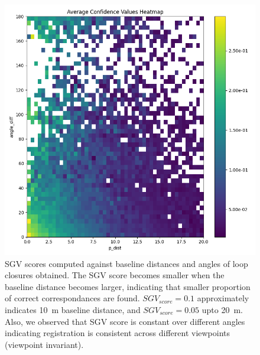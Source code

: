 \begin{figure}[t]
  \centering
  \includegraphics*[width=0.8\columnwidth]{pics/methods_svg_distance.png}
  \caption{SGV scores computed against baseline distances and angles of loop closures obtained. The SGV score becomes smaller when the baseline distance becomes larger, indicating that smaller proportion of correct correspondances are found. $SGV_{score}=0.1$ approximately indicates \SI{10}{\meter} baseline distance, and $SGV_{score}=0.05$ upto \SI{20}{\meter}. Also, we observed that SGV score is constant over different angles indicating registration is consistent across different viewpoints (viewpoint invariant).}
  \label{fig:sgv_distance}
\end{figure}


